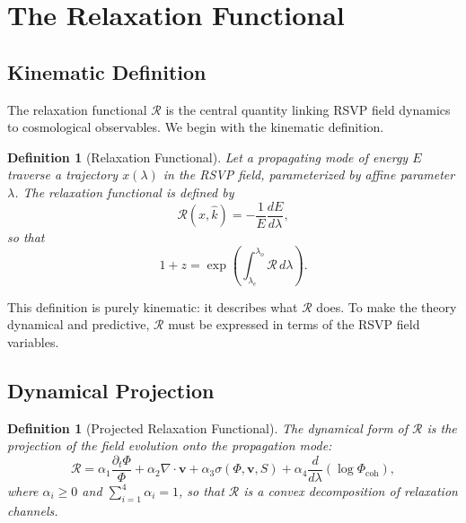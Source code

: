 \documentclass[12pt,a4paper]{article}
\newtheorem{definition}[theorem]{Definition}
\theoremstyle{remark}
\newcommand{\vv}{\mathbf{v}}
\newcommand{\Rcal}{\mathcal{R}}
\begin{document}
\section{The Relaxation Functional}
\label{sec:relaxation}

\subsection{Kinematic Definition}

The relaxation functional $\Rcal$ is the central quantity linking RSVP field dynamics to cosmological observables. We begin with the kinematic definition.

\begin{definition}[Relaxation Functional]
Let a propagating mode of energy $E$ traverse a trajectory $x(\lambda)$ in the RSVP field, parameterized by affine parameter $\lambda$. The relaxation functional is defined by
\begin{equation}
\boxed{\Rcal(x, \hat{k}) = -\frac{1}{E}\frac{dE}{d\lambda},}
\label{eq:R_kinematic}
\end{equation}
so that
\begin{equation}
1 + z = \exp\!\left(\int_{\lambda_e}^{\lambda_o} \Rcal\, d\lambda\right).
\label{eq:redshift_R}
\end{equation}
\end{definition}

This definition is purely kinematic: it describes what $\Rcal$ does. To make the theory dynamical and predictive, $\Rcal$ must be expressed in terms of the RSVP field variables.

\subsection{Dynamical Projection}

\begin{definition}[Projected Relaxation Functional]
The dynamical form of $\Rcal$ is the projection of the field evolution onto the propagation mode:
\begin{equation}
\boxed{\Rcal = \alpha_1 \frac{\partial_t \Phi}{\Phi} + \alpha_2 \nabla \cdot \vv + \alpha_3 \sigma(\Phi, \vv, S) + \alpha_4 \frac{d}{d\lambda}\!\left(\log \Phi_{\mathrm{coh}}\right),}
\label{eq:R_dynamic}
\end{equation}
where $\alpha_i \ge 0$ and $\sum_{i=1}^4 \alpha_i = 1$, so that $\Rcal$ is a convex decomposition of relaxation channels.
\end{definition}
\end{document}
